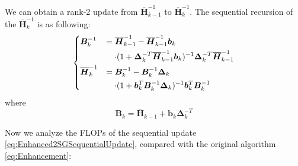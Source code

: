 \documentclass[conference]{IEEEtran}
\newcommand{\bDelta}{\bm{\Delta}}
\newcommand{\oH}{\bm{\overline{H}}}
\begin{document}
We can obtain a rank-2 update from $ \oH_{k-1}^{-1} $ to $ \oH_{k}^{-1} $. The sequential recursion of the $ \oH_k^{-1} $ is as following:
\begin{equation} \label{eq:Enhanced2SGSequentialUpdate}
\begin{dcases}
\bm{B}_k^{-1}
&=\oH_{k-1}^{-1}-\oH_{k-1}^{-1}\bm{b}_k\\
&~~~\cdot(1+\bDelta_k^{-T}\oH_{k-1}^{-1}\bm{b}_k)^{-1}\bDelta_k^{-T}\oH_{k-1}^{-1}\\
\oH_k^{-1}
&=\bm{B}_k^{-1}-\bm{B}_k^{-1}\bDelta_k\\
&~~~\cdot(1+\bm{b}_k^{T}\bm{B}_k^{-1}\bDelta_k)^{-1}\bm{b}_k^{T}\bm{B}_k^{-1}
\end{dcases}
\end{equation}
where
\begin{equation} \label{eq:Enhanced2SGB}
\bm{B}_k=\oH_{k-1}+\bm{b}_k\bDelta_k^{-T}
\end{equation}

Now we analyze the FLOPs of the sequential update \ref{eq:Enhanced2SGSequentialUpdate}, compared with the original algorithm \ref{eq:Enhancement}:

%
%

\end{document}
